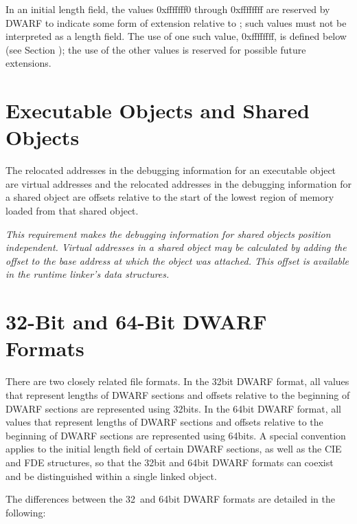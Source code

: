 In an initial length field, the values 0xfffffff0 through
0xffffffff are reserved by DWARF to indicate some form of
extension relative to ; such values must not
be interpreted as a length field. The use of one such value,
0xffffffff, is defined below 
(see Section ); 
the use of
the other values is reserved for possible future extensions.



\section{Executable Objects and Shared Objects} 
\label{datarep:executableobjectsandsharedobjects}

The relocated addresses in the debugging information for an
executable object are virtual addresses and the relocated
addresses in the debugging information for a shared object
are offsets relative to the start of the lowest region of
memory loaded from that shared object.

\textit{This requirement makes the debugging information for
shared objects position independent.  Virtual addresses in a
shared object may be calculated by adding the offset to the
base address at which the object was attached. This offset
is available in the run\dash time linker’s data structures.}



\section{32-Bit and 64-Bit DWARF Formats}
\label{datarep:32bitand64bitdwarfformats}

There are two closely related file formats. In the 32\dash bit DWARF
format, all values that represent lengths of DWARF sections
and offsets relative to the beginning of DWARF sections are
represented using 32\dash bits. In the 64\dash bit DWARF format, all
values that represent lengths of DWARF sections and offsets
relative to the beginning of DWARF sections are represented
using 64\dash bits. A special convention applies to the initial
length field of certain DWARF sections, as well as the CIE and
FDE structures, so that the 32\dash bit and 64\dash bit DWARF formats
can coexist and be distinguished within a single linked object.

The differences between the 32\dash\   and 64\dash bit 
DWARF formats are
detailed in the following:



